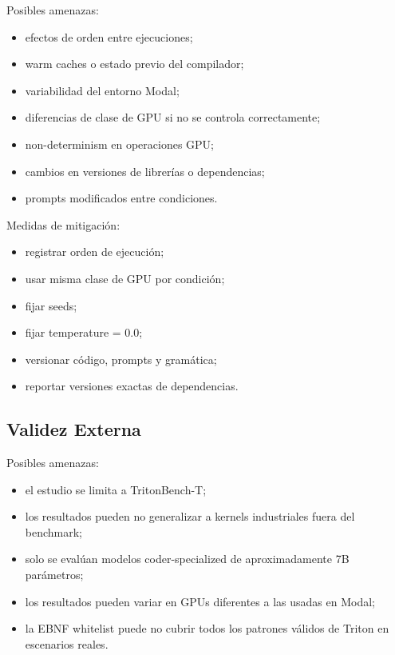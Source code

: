\documentclass[12pt]{article}
\begin{document}
Posibles amenazas:

\begin{itemize}
    \item efectos de orden entre ejecuciones;
    \item warm caches o estado previo del compilador;
    \item variabilidad del entorno Modal;
    \item diferencias de clase de GPU si no se controla correctamente;
    \item non-determinism en operaciones GPU;
    \item cambios en versiones de librerías o dependencias;
    \item prompts modificados entre condiciones.
\end{itemize}

Medidas de mitigación:

\begin{itemize}
    \item registrar orden de ejecución;
    \item usar misma clase de GPU por condición;
    \item fijar seeds;
    \item fijar temperature = 0.0;
    \item versionar código, prompts y gramática;
    \item reportar versiones exactas de dependencias.
\end{itemize}

\subsection{Validez Externa}

Posibles amenazas:

\begin{itemize}
    \item el estudio se limita a TritonBench-T;
    \item los resultados pueden no generalizar a kernels industriales fuera del benchmark;
    \item solo se evalúan modelos coder-specialized de aproximadamente 7B parámetros;
    \item los resultados pueden variar en GPUs diferentes a las usadas en Modal;
    \item la EBNF whitelist puede no cubrir todos los patrones válidos de Triton en escenarios reales.
\end{itemize}
\end{document}
